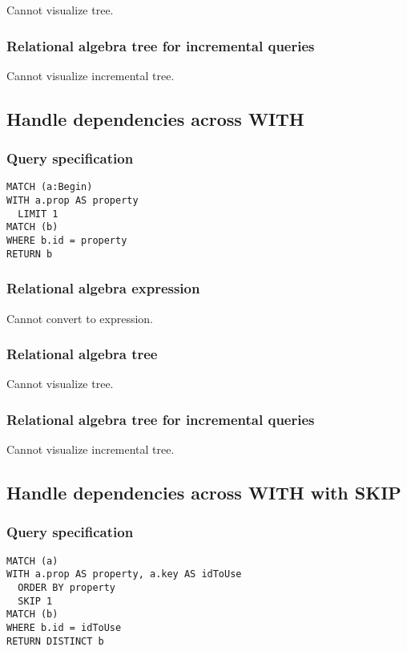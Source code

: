 Cannot visualize tree.

\subsubsection*{Relational algebra tree for incremental queries}

Cannot visualize incremental tree.

\subsection{Handle dependencies across WITH}

\subsubsection*{Query specification}

\begin{lstlisting}
MATCH (a:Begin)
WITH a.prop AS property
  LIMIT 1
MATCH (b)
WHERE b.id = property
RETURN b
\end{lstlisting}

\subsubsection*{Relational algebra expression}

Cannot convert to expression.

\subsubsection*{Relational algebra tree}

Cannot visualize tree.

\subsubsection*{Relational algebra tree for incremental queries}

Cannot visualize incremental tree.

\subsection{Handle dependencies across WITH with SKIP}

\subsubsection*{Query specification}

\begin{lstlisting}
MATCH (a)
WITH a.prop AS property, a.key AS idToUse
  ORDER BY property
  SKIP 1
MATCH (b)
WHERE b.id = idToUse
RETURN DISTINCT b
\end{lstlisting}

